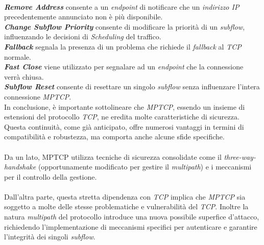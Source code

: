 \\
\indent \textbf{\emph{Remove Address}} consente a un \emph{endpoint} di notificare che un \emph{indirizzo IP} precedentemente annunciato non è più disponibile.
\\
\indent \textbf{\emph{Change Subflow Priority}} consente di modificare la priorità di un \emph{subflow}, influenzando le decisioni di \emph{Scheduling} del traffico.
\\
\indent \textbf{\emph{Fallback}} segnala la presenza di un problema che richiede il \emph{fallback} al \emph{TCP} normale.
\\
\indent \textbf{\emph{Fast Close}} viene utilizzato per segnalare ad un \emph{endpoint} che la connessione verrà chiusa.
\\
\indent \textbf{\emph{Subflow Reset}} consente di resettare un singolo \emph{subflow} senza influenzare l'intera connessione \emph{MPTCP}.
\\

\indent In conclusione, è importante sottolineare che \emph{MPTCP}, essendo un insieme di estensioni del protocollo \emph{TCP}, ne eredita molte caratteristiche di sicurezza. Questa continuità, come già anticipato, offre numerosi vantaggi in termini di compatibilità e robustezza, ma comporta anche alcune sfide specifiche.
\\\\
Da un lato, {MPTCP} utilizza tecniche di sicurezza consolidate come il \emph{three-way-handshake} (opportunamente modificato per gestire il \emph{multipath}) e i meccanismi per il controllo della gestione. 
\\\\
Dall'altra parte, questa stretta dipendenza con \emph{TCP} implica che \emph{MPTCP} sia soggetto a molte delle stesse problematiche e vulnerabilità del \emph{TCP}. 
Inoltre la natura \emph{multipath} del protocollo introduce una nuova possibile superfice d'attacco, richiedendo l'implementazione di meccanismi specifici per autenticare e garantire l'integrità dei singoli \emph{subflow}.

